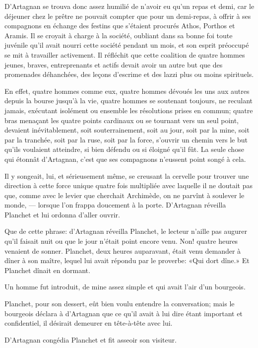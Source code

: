 D'Artagnan se trouva donc assez humilié de n'avoir eu qu'un repas et demi, car le déjeuner chez le prêtre ne pouvait compter que pour un demi-repas, à offrir à ses compagnons en échange des festins que s'étaient procurés Athos, Porthos et Aramis. Il se croyait à charge à la société, oubliant dans sa bonne foi toute juvénile qu'il avait nourri cette société pendant un mois, et son esprit préoccupé se mit à travailler activement. Il réfléchit que cette coalition de quatre hommes jeunes, braves, entreprenants et actifs devait avoir un autre but que des promenades déhanchées, des leçons d'escrime et des lazzi plus ou moins spirituels. 

En effet, quatre hommes comme eux, quatre hommes dévoués les uns aux autres depuis la bourse jusqu'à la vie, quatre hommes se soutenant toujours, ne reculant jamais, exécutant isolément ou ensemble les résolutions prises en commun; quatre bras menaçant les quatre points cardinaux ou se tournant vers un seul point, devaient inévitablement, soit souterrainement, soit au jour, soit par la mine, soit par la tranchée, soit par la ruse, soit par la force, s'ouvrir un chemin vers le but qu'ils voulaient atteindre, si bien défendu ou si éloigné qu'il fût. La seule chose qui étonnât d'Artagnan, c'est que ses compagnons n'eussent point songé à cela. 

Il y songeait, lui, et sérieusement même, se creusant la cervelle pour trouver une direction à cette force unique quatre fois multipliée avec laquelle il ne doutait pas que, comme avec le levier que cherchait Archimède, on ne parvînt à soulever le monde, --- lorsque l'on frappa doucement à la porte. D'Artagnan réveilla Planchet et lui ordonna d'aller ouvrir. 

Que de cette phrase: d'Artagnan réveilla Planchet, le lecteur n'aille pas augurer qu'il faisait nuit ou que le jour n'était point encore venu. Non! quatre heures venaient de sonner. Planchet, deux heures auparavant, était venu demander à dîner à son maître, lequel lui avait répondu par le proverbe: «Qui dort dîne.» Et Planchet dînait en dormant. 

Un homme fut introduit, de mine assez simple et qui avait l'air d'un bourgeois. 

Planchet, pour son dessert, eût bien voulu entendre la conversation; mais le bourgeois déclara à d'Artagnan que ce qu'il avait à lui dire étant important et confidentiel, il désirait demeurer en tête-à-tête avec lui. 

D'Artagnan congédia Planchet et fit asseoir son visiteur. 

